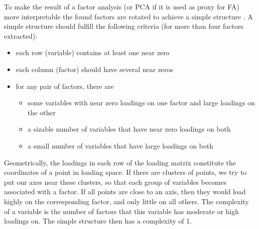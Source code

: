 To make the result of a factor analysis (or \acs{PCA} if it is used as proxy for \acs{FA}) more interpretable the found factors are rotated to achieve a simple structure \parencite{Thur-47}. A simple structure should fulfill the following criteria (for more than four factors extracted):
\begin{itemize}
  \item{each row (variable) contains at least one near zero}
  \item{each column (factor) should have several near zeros}
  \item{for any pair of factors, there are
     \begin{itemize}
       \item{some variables with near zero loadings on one factor and large loadings on the other}
       \item{a sizable number of variables that have near zero loadings on both}
       \item{a small number of variables that have large loadings on both}
     \end{itemize} }
\end{itemize}
Geometrically, the loadings in each row of the loading matrix constitute the coordinates of a point in loading space. If there are clusters of points, we try to put our axes near these clusters, so that each group of variables becomes associated with a factor. If all points are close to an axis, then they would load highly on the corresponding factor, and only little on all others. The complexity of a variable is the number of factors that this variable has moderate or high loadings on. The simple structure then has a complexity of 1.

